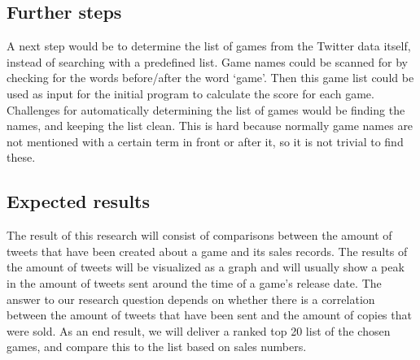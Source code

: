 \subsection{Further steps}
A next step would be to determine the list of games from the Twitter data itself, instead of searching with a predefined list. Game names could be scanned for by checking for the words before/after the word ‘game’. Then this game list could be used as input for the initial program to calculate the score for each game. Challenges for automatically determining the list of games would be finding the names, and keeping the list clean. This is hard because normally game names are not mentioned with a certain term in front or after it, so it is not trivial to find these.
\subsection{Expected results}
The result of this research will consist of comparisons between the amount of tweets that have been created about a game and its sales records. The results of the amount of tweets will be visualized as a graph and will usually show a peak in the amount of tweets sent around the time of a game’s release date. The answer to our research question depends on whether there is a correlation between the amount of tweets that have been sent and the amount of copies that were sold. As an end result, we will deliver a ranked top 20 list of the chosen games, and compare this to the list based on sales numbers.


